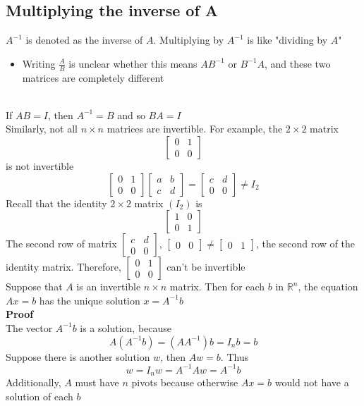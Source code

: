 \subsection{Multiplying the inverse of A}
$A^{-1}$ is denoted as the inverse of $A$. Multiplying by $A^{-1}$ is like 
"dividing by $A$"
\begin{itemize}
  \item Writing $\frac{A}{B}$ is unclear whether this means $AB^{-1}$ or $B^{-1}A$, 
    and these two matrices are completely different
\end{itemize}
\\[8pt]
If $AB = I$, then $A^{-1} = B$ and so $BA = I$
\\[8pt]
Similarly, not all $n \times n$ matrices are invertible. For example, the $2 \times 
2$ matrix 
\[
  \begin{bmatrix}
    0 & 1 \\
    0 & 0
  \end{bmatrix}
\]
is not invertible
\[
  \begin{bmatrix}
    0 & 1 \\
    0 & 0
  \end{bmatrix} \begin{bmatrix}
    a & b \\
    c & d
  \end{bmatrix} = \begin{bmatrix}
    c & d \\
    0 & 0
  \end{bmatrix} \neq I_2
\]
Recall that the identity $2 \times 2$ matrix $(I_2)$ is 
\[
  \begin{bmatrix}
    1 & 0 \\
    0 & 1
  \end{bmatrix}
\]
The second row of matrix $\begin{bmatrix}
  c & d \\
  0 & 0
\end{bmatrix}$, $\begin{bmatrix}
  0 & 0
\end{bmatrix} \neq \begin{bmatrix}
  0 & 1
\end{bmatrix}$, the second row of the identity matrix. Therefore, $\begin{bmatrix}
  0 & 1 \\
  0 & 0
\end{bmatrix}$ can't be invertible
\\[8pt]
Suppose that $A$ is an invertible $n \times n$ matrix. Then for each $b$ in 
$\mathbb{R}^n$, the equation $Ax = b$ has the unique solution $x = A^{-1}b$ 
\\[8pt]
\textbf{Proof}
\\[8pt]
The vector $A^{-1}b$ is a solution, because 
\[
  A(A^{-1}b) = (AA^{-1})b = I_nb = b
\]
Suppose there is another solution $w$, then $Aw = b$. Thus 
\[
  w = I_nw = A^{-1}Aw = A^{-1}b
\]
Additionally, $A$ must have $n$ pivots because otherwise $Ax = b$ would not have a 
solution of each $b$

